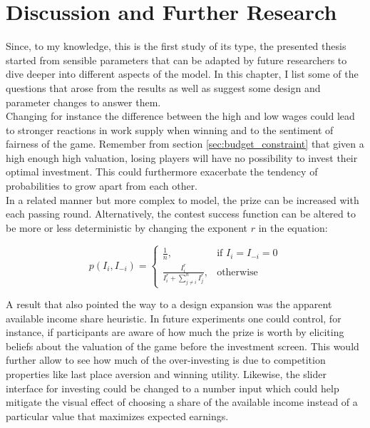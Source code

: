 \thispagestyle{fancy}
\chapter{Discussion and Further Research}
\label{ch:discussion}

Since, to my knowledge, this is the first study of its type, the presented thesis started from sensible parameters that can be adapted by future researchers to dive deeper into different aspects of the model. In this chapter, I list some of the questions that arose from the results as well as suggest some design and parameter changes to answer them.\\

Changing for instance the difference between the high and low wages could lead to stronger reactions in work supply when winning and to the sentiment of fairness of the game. Remember from section \ref{sec:budget_constraint} that given a high enough high valuation, losing players will have no possibility to invest their optimal investment. This could furthermore exacerbate the tendency of probabilities to grow apart from each other.\\

In a related manner but more complex to model, the prize can be increased with each passing round. Alternatively, the contest success function can be altered to be more or less deterministic by changing the exponent $r$ in the equation:

\begin{equation}
    p(I_i,I_{-i}) =
\begin{cases}
    \frac{1}{n},& \text{if } I_i = I_{-i} = 0\\
    \frac{I_i^r}{I_i^r + \sum_{j\neq i}^n I_{j}^r},              & \text{otherwise}
\end{cases}
\label{eq:csf_exp}    
\end{equation}

A result that also pointed the way to a design expansion was the apparent available income share heuristic. In future experiments one could control, for instance, if participants are aware of how much the prize is worth by eliciting beliefs about the valuation of the game before the investment screen. This would further allow to see how much of the over-investing is due to competition properties like last place aversion and winning utility. Likewise, the slider interface for investing could be changed to a number input which could help mitigate the visual effect of choosing a share of the available income instead of a particular value that maximizes expected earnings.\\

